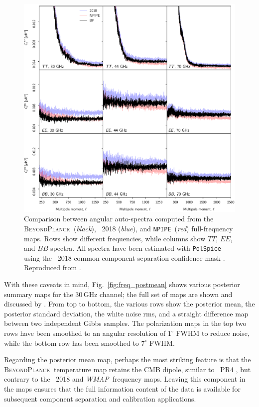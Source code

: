 \documentclass[twocolumn]{aa}
\def\WMAP{\emph{WMAP}}
\newcommand{\BP}{\textsc{BeyondPlanck}}
\newcommand{\npipe}[0]{\texttt{NPIPE}}
\begin{document}
\begin{figure}[t]
  \center
  \includegraphics[width=\linewidth]{figs/cls_bp_npipe_dpc_zoom_BP10.pdf}
  \caption{Comparison between angular auto-spectra computed from the \BP\
    (\emph{black}), \Planck\ 2018 (\emph{blue}), and \npipe\ (\emph{red})
    full-frequency maps. Rows show different frequencies, while columns show
    $TT$, $EE$, and $BB$ spectra. All spectra have been estimated with
    \texttt{PolSpice} using the \Planck\ 2018 common component separation confidence mask \citep{planck2016-l04}. Reproduced from \citet{bp10}. \label{fig:powspec_full}}
\end{figure}

With these caveats in mind, Fig.~\ref{fig:freq_postmean} shows various
posterior summary maps for the 30\,GHz channel; the full set of maps
are shown and discussed by \citet{bp10}. From top to bottom, the
various rows show the posterior mean, the posterior standard
deviation, the white noise rms, and a straight difference map between
two independent Gibbs samples. The polarization maps in the top two
rows have been smoothed to an angular resolution of $1^{\circ}$ FWHM
to reduce noise, while the bottom row has been smoothed to $7^{\circ}$
FWHM.

Regarding the posterior mean map, perhaps the most striking feature is
that the \BP\ temperature map retains the CMB dipole, similar to
\Planck\ PR4 \citet{planck2020-LVII}, but contrary to the
\Planck\ 2018 and \WMAP\ frequency maps. Leaving this component in the
maps ensures that the full information content of the data is
available for subsequent component separation and calibration
applications.
\end{document}
